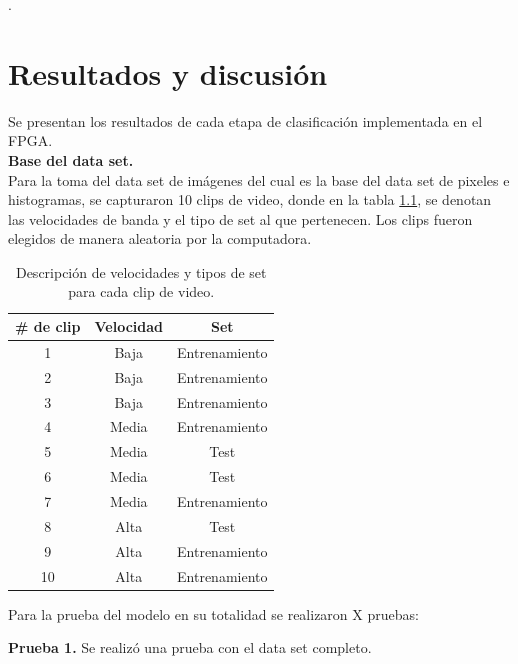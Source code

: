 \documentclass[twoside,spanish,ESP,MSc]{plantillaLabUPV}
\theoremstyle{definition}
\begin{document}


.\chapter{Resultados y discusión}

Se presentan los resultados de cada etapa de clasificación implementada en el FPGA.\\

\checkmark\textbf{Base del data set.}\\
Para la toma del data set de imágenes del cual es la base del data set de pixeles e histogramas, se capturaron 10 clips de video, donde en la tabla \ref{clips}, se denotan las velocidades de banda y el tipo de set al que pertenecen. Los clips fueron elegidos de manera aleatoria por la computadora.


\begin{table}[h]
	\caption{Descripción de velocidades y tipos de set para cada clip de video.}
	\label{clips}
	\centering
	\begin{tabular}{|c|c|c|}
		\hline
		\# de clip & Velocidad & Set \\
		\hline
		1 & Baja & Entrenamiento \\
		\hline
		2 & Baja & Entrenamiento \\
		\hline
		3 & Baja & Entrenamiento \\
		\hline
		4 & Media & Entrenamiento \\
		\hline
		5 & Media & Test \\
		\hline
		6 & Media & Test \\
		\hline
		7 & Media & Entrenamiento \\
		\hline
		8 & Alta & Test \\
		\hline
		9 & Alta & Entrenamiento \\
		\hline
		10 & Alta & Entrenamiento \\
		\hline
	\end{tabular}
\end{table}

Para la prueba del modelo en su totalidad se realizaron X pruebas:

\checkmark\textbf{Prueba 1.} Se realizó una prueba con el data set completo.
\end{document}
